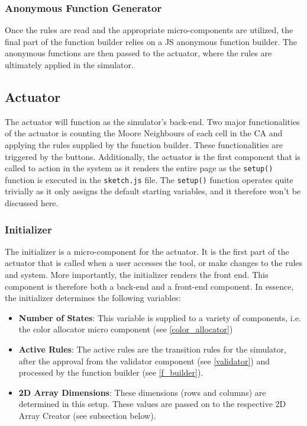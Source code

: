 \subsubsection{Anonymous Function Generator}
Once the rules are read and the appropriate micro-components are utilized, the final part of the function builder relies on a JS anonymous function builder. The anonymous functions are then passed to the actuator, where the rules are ultimately applied in the simulator.

\subsection{Actuator} \label{actuator}
The actuator will function as the simulator's back-end. Two major functionalities of the actuator is counting the Moore Neighbours of each cell in the CA and applying the rules supplied by the function builder. These functionalities are triggered by the buttons. Additionally, the actuator is the first component that is called to action in the system as it renders the entire page as the \texttt{setup()} function is executed in the \texttt{sketch.js} file. The \texttt{setup()} function operates quite trivially as it only assigns the default starting variables, and it therefore won't be discussed here. 
\subsubsection{Initializer} \label{initializer}
The initializer is a micro-component for the actuator. It is the first part of the actuator that is called when a user accesses the tool, or make changes to the rules and system. More importantly, the initializer renders the front end. This component is therefore both a back-end and a front-end component. In essence, the initializer determines the following variables:
\begin{itemize}
    \item \textbf{Number of States}: This variable is supplied to a variety of components, i.e. the color allocator micro component (see \ref{color_allocator})
    \item \textbf{Active Rules}: The active rules are the transition rules for the simulator, after the approval from the validator component (see \ref{validator}) and processed by the function builder (see \ref{f_builder}). 
    \item \textbf{2D Array Dimensions}: These dimensions (rows and columns) are determined in this setup. These values are passed on to the respective 2D Array Creator (see subsection below).
\end{itemize}

